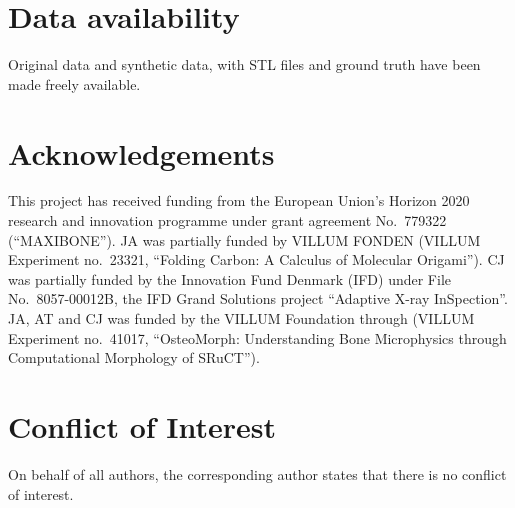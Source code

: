 \section{Data availability}

Original data and synthetic data, with STL files and ground truth have been
made freely available. %

\section{Acknowledgements}

This project has received funding from the European Union’s Horizon 2020
research and innovation programme under grant agreement No.~779322
(``MAXIBONE'').  JA was partially funded by VILLUM FONDEN (VILLUM Experiment
no.~23321, “Folding Carbon: A Calculus of Molecular Origami”).  CJ was partially
funded by the Innovation Fund Denmark (IFD) under File No.~8057-00012B, the IFD
Grand Solutions project ``Adaptive X-ray InSpection''.  JA, AT and CJ was funded
by the VILLUM Foundation through (VILLUM Experiment no.~41017, “OsteoMorph:
Understanding Bone Microphysics through Computational Morphology of SRuCT”).

\section{Conflict of Interest}
On behalf of all authors, the corresponding author states that there is no
conflict of interest.

